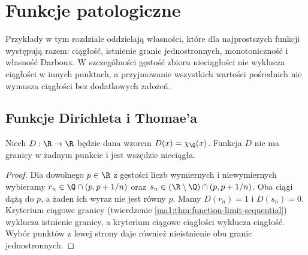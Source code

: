 \chapter{Funkcje patologiczne}
\label{ma1:ch:pathological-functions}

Przykłady w tym rozdziale oddzielają własności, które dla najprostszych funkcji występują razem: ciągłość, istnienie granic jednostronnych, monotoniczność i własność Darboux. W szczególności gęstość zbioru nieciągłości nie wyklucza ciągłości w innych punktach, a przyjmowanie wszystkich wartości pośrednich nie wymusza ciągłości bez dodatkowych założeń.

\section{Funkcje Dirichleta i Thomae'a}
\begin{przyklad}
\label{ma1:ex:dirichlet}
Niech $D:\R\to\R$ będzie dana wzorem $D(x)=\chi_{\Q}(x)$. Funkcja $D$ nie ma granicy w żadnym punkcie i jest wszędzie nieciągła.
\end{przyklad}
\begin{proof}
Dla dowolnego $p\in\R$ z gęstości liczb wymiernych i niewymiernych wybieramy $r_n\in\Q\cap(p,p+1/n)$ oraz $s_n\in(\R\setminus\Q)\cap(p,p+1/n)$. Oba ciągi dążą do $p$, a żaden ich wyraz nie jest równy $p$. Mamy $D(r_n)=1$ i $D(s_n)=0$. Kryterium ciągowe granicy (twierdzenie \ref{ma1:thm:function-limit-sequential}) wyklucza istnienie granicy, a kryterium ciągowe ciągłości wyklucza ciągłość. Wybór punktów z lewej strony daje również nieistnienie obu granic jednostronnych.
\end{proof}

